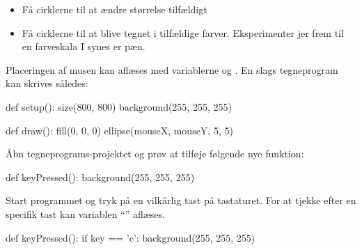 \documentclass{ucph-handout}
\begin{document}
\begin{exercisebox}[adjusted title=Opgaver: ]


\begin{itemize}
\item Få cirklerne til at ændre størrelse tilfældigt
\item Få cirklerne til at blive tegnet i tilfældige
  farver. Eksperimenter jer frem til en farveskala I synes er pæn.
\end{itemize}

\end{exercisebox}

\begin{exercisebox}[adjusted title=Input fra musen]
Placeringen af musen kan aflæses med variablerne 
og . En slags tegneprogram kan skrives således:
\begin{python}
def setup():
    size(800, 800)
    background(255, 255, 255)

def draw():
    fill(0, 0, 0)
    ellipse(mouseX, mouseY, 5, 5)
\end{python}
\end{exercisebox}

\begin{exercisebox}[adjusted title=Tastatur input]
Åbn tegneprograms-projektet og prøv at tilføje følgende nye funktion:
\begin{python}
def keyPressed():
    background(255, 255, 255)
\end{python}
Start programmet og tryk på en vilkårlig tast på tastaturet. For at
tjekke efter en specifik tast kan variablen ``'' aflæses.
\begin{python}
def keyPressed():
    if key == 'c':
        background(255, 255, 255)
\end{python}
\end{exercisebox}
\end{document}
